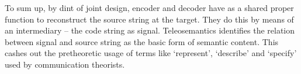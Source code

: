 To sum up, by dint of joint design, encoder and decoder have as a shared proper function to reconstruct the source string at the target.
They do this by means of an intermediary -- the code string as signal.
Teleosemantics identifies the relation between signal and source string as the basic form of semantic content.
This cashes out the pretheoretic usage of terms like `represent', `describe' and `specify' used by communication theorists.




